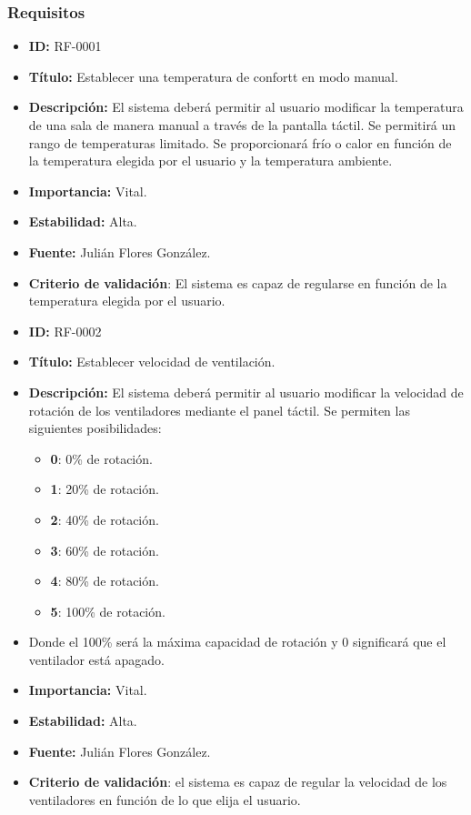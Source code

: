 \subsubsection{Requisitos}
\begin{itemize}
    \item \textbf{ID:} RF-0001
    \item \textbf{Título:} Establecer una temperatura de confortt en modo manual.
    \item \textbf{Descripción:} El sistema deberá permitir al usuario modificar la temperatura de una sala de manera manual a través de la pantalla táctil. Se permitirá un rango de temperaturas limitado. Se proporcionará frío o calor en función de la temperatura elegida por el usuario y la temperatura ambiente.
    \item \textbf{Importancia:} Vital.
    \item \textbf{Estabilidad:} Alta.
    \item \textbf{Fuente:} Julián Flores González.
    \item \textbf{Criterio de validación}: El sistema es capaz de regularse en función de la temperatura elegida por el usuario.
\end{itemize}
\begin{itemize}
    \item \textbf{ID:} RF-0002
    \item \textbf{Título:} Establecer velocidad de ventilación.
    \item \textbf{Descripción:} El sistema deberá permitir al usuario modificar la velocidad de rotación de los ventiladores mediante el panel táctil. Se permiten las siguientes posibilidades:
          \begin{itemize}
              \item \textbf{0}: 0\% de rotación.
              \item \textbf{1}: 20\% de rotación.
              \item \textbf{2}: 40\% de rotación.
              \item \textbf{3}: 60\% de rotación.
              \item \textbf{4}: 80\% de rotación.
              \item \textbf{5}: 100\% de rotación.
          \end{itemize}
    \item[] Donde el 100\% será la máxima capacidad de rotación y 0 significará que el ventilador está apagado.
    \item \textbf{Importancia:} Vital.
    \item \textbf{Estabilidad:} Alta.
    \item \textbf{Fuente:} Julián Flores González.
    \item \textbf{Criterio de validación}: el sistema es capaz de regular la velocidad de los ventiladores en función de lo que elija el usuario.
\end{itemize}


